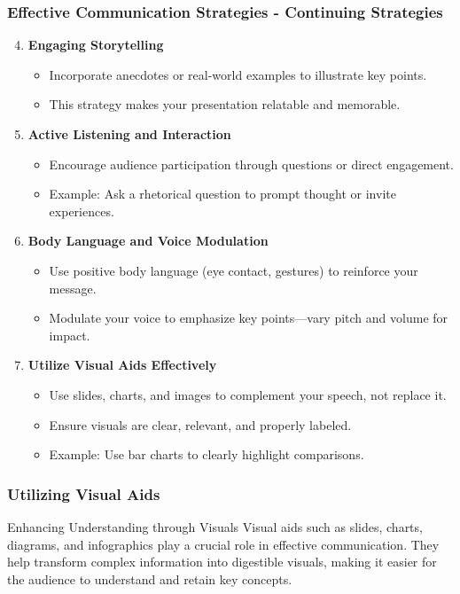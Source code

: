 \documentclass[aspectratio=169]{beamer}
\begin{document}
\begin{frame}[fragile]
    \frametitle{Effective Communication Strategies - Continuing Strategies}
    \begin{enumerate}
        \setcounter{enumi}{3}
        \item \textbf{Engaging Storytelling}
        \begin{itemize}
            \item Incorporate anecdotes or real-world examples to illustrate key points.
            \item This strategy makes your presentation relatable and memorable.
        \end{itemize}

        \item \textbf{Active Listening and Interaction}
        \begin{itemize}
            \item Encourage audience participation through questions or direct engagement.
            \item Example: Ask a rhetorical question to prompt thought or invite experiences.
        \end{itemize}

        \item \textbf{Body Language and Voice Modulation}
        \begin{itemize}
            \item Use positive body language (eye contact, gestures) to reinforce your message.
            \item Modulate your voice to emphasize key points—vary pitch and volume for impact.
        \end{itemize}

        \item \textbf{Utilize Visual Aids Effectively}
        \begin{itemize}
            \item Use slides, charts, and images to complement your speech, not replace it.
            \item Ensure visuals are clear, relevant, and properly labeled.
            \item Example: Use bar charts to clearly highlight comparisons.
        \end{itemize}
    \end{enumerate}
\end{frame}

\begin{frame}[fragile]
    \frametitle{Utilizing Visual Aids}
    \begin{block}{Enhancing Understanding through Visuals}
        Visual aids such as slides, charts, diagrams, and infographics play a crucial role in effective communication. They help transform complex information into digestible visuals, making it easier for the audience to understand and retain key concepts.
    \end{block}
\end{frame}
\end{document}
